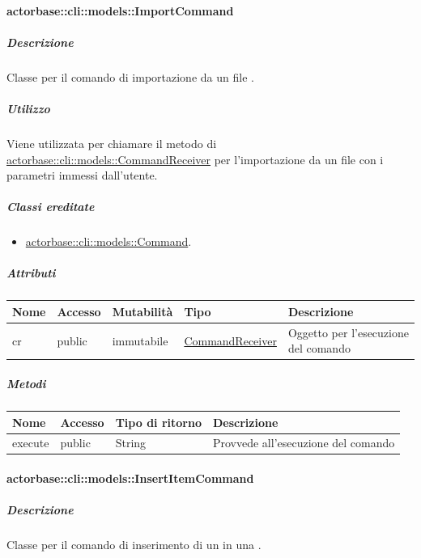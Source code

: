 \documentclass{scalatekids-article}
\begin{document}
\paragraph{actorbase::cli::models::ImportCommand}
\label{sec:actorbase::cli::models::ImportCommand}

\subparagraph{Descrizione}

Classe per il comando di importazione da un file .

\subparagraph{Utilizzo}

Viene utilizzata per chiamare il metodo di
\hyperref[sec:actorbase::cli::models::CommandReceiver]{actorbase::cli::models::CommandReceiver} per l'importazione da un file
 con i parametri immessi dall'utente.

\subparagraph{Classi ereditate}

\begin{itemize}
\item \hyperref[sec:actorbase::cli::models::Command]{actorbase::cli::models::Command}.
\end{itemize}

\subparagraph{Attributi}
\begin{tabular}{| p{1cm} | p{1.5cm} | p{2cm} | p{4cm} | p{8.5cm} |}
  \hline
  Nome & Accesso & Mutabilità & Tipo & Descrizione\\
  \hline
  cr & public & immutabile & \hyperref[sec:actorbase::cli::models::CommandReceiver]{CommandReceiver} & Oggetto per l'esecuzione del comando\\
  \hline
\end{tabular}

\subparagraph{Metodi}

\begin{tabular}{| l | l | l | l |}
  \hline
  Nome & Accesso & Tipo di ritorno & Descrizione\\
  \hline
  execute & public & String & Provvede all'esecuzione del comando\\
  \hline
\end{tabular}

\paragraph{actorbase::cli::models::InsertItemCommand}
\label{sec:actorbase::cli::models::InsertItemCommand}

\subparagraph{Descrizione}

Classe per il comando di inserimento di un  in una
.
\end{document}
